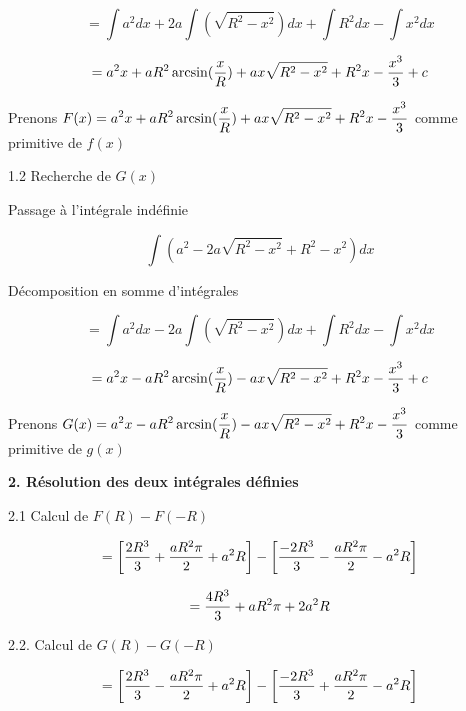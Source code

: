 \documentclass[10pt]{article}
\begin{document}
$$=\int a^2dx + 2a\int(\sqrt{R^2-x^2})dx + \int R^2dx - \int x^2dx$$

$$=a^2x + aR^2\arcsin({x\over{R}}) + ax\sqrt{R^2-x^2} + R^2x - {x^3\over{3}} + c$$

\begin{center}
\hspace{0.8cm} Prenons $\displaystyle{F(x)=a^2x + aR^2\arcsin({x\over{R}}) + ax\sqrt{R^2-x^2} + R^2x - {x^3\over{3}}}$ comme primitive de $f(x)$\vspace{0.2cm}
\end{center}

1.2 Recherche de $G(x)$ \vspace{0.5cm}

\hspace{0.8cm} Passage à l'intégrale indéfinie\vspace{0.2cm}

$$\int (a^2-2a\sqrt{R^2-x^2}+R^2-x^2)dx$$\vspace{0.01cm}

\hspace{0.8cm} Décomposition en somme d'intégrales\vspace{0.2cm}

$$=\int a^2dx - 2a\int(\sqrt{R^2-x^2})dx + \int R^2dx - \int x^2dx$$

$$=a^2x - aR^2\arcsin({x\over{R}}) - ax\sqrt{R^2-x^2} + R^2x - {x^3\over{3}} + c$$

\begin{center}
\hspace{0.8cm} Prenons $\displaystyle{G(x)=a^2x - aR^2\arcsin({x\over{R}}) - ax\sqrt{R^2-x^2} + R^2x - {x^3\over{3}}}$ comme primitive de $g(x)$\vspace{0.2cm}
\end{center}

\textbf{2. Résolution des deux intégrales définies}\vspace{0.5cm}

2.1 Calcul de $F(R)-F(-R)$\vspace{0.2cm}

$$=\left[{2R^3\over{3}}+{aR^2\pi\over{2}}+a^2R\right]-\left[{-2R^3\over{3}}-{aR^2\pi\over{2}} - a^2R\right]$$

$$={4R^3\over{3}}+aR^2\pi + 2a^2R$$\vspace{0.01cm}

2.2. Calcul de $G(R)-G(-R)$\vspace{0.2cm}

$$=\left[{2R^3\over{3}}-{aR^2\pi\over{2}}+a^2R\right]-\left[{-2R^3\over{3}}+{aR^2\pi\over{2}} - a^2R\right]$$
\end{document}
